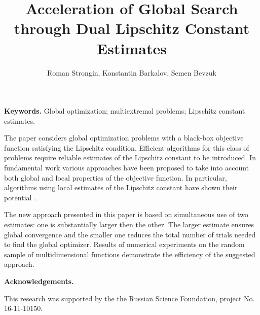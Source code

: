 \documentclass[oribibl]{llncs}
\begin{document}
\cleardoublepage

\title{Acceleration of Global Search through Dual Lipschitz Constant Estimates}
\author{Roman Strongin, Konstantin Barkalov, Semen Bevzuk}



\maketitle

\thispagestyle{fancy}

\textbf{Keywords.} Global optimization; multiextremal problems; Lipschitz constant estimates.

 \vspace*{0.5cm}


The paper considers global optimization problems with a black-box objective function satisfying the Lipschitz condition. 
Efficient algorithms for this class of problems require reliable estimates of the Lipschitz constant to be introduced. 
In fundamental work \cite{Book} various approaches have been proposed to take into account both global and local properties of the objective function. 
In particular, algorithms using local estimates of the Lipschitz constant have shown their potential \cite{Sergeyev10, Sergeyev16}.

The new approach presented in this paper is based on simultaneous use of two estimates: one is substantially larger then the other. 
The larger estimate ensures global convergence and the smaller one reduces the total number of trials needed to find the global optimizer.
Results of numerical experiments on the random sample of multidimensional functions demonstrate the efficiency of the suggested approach.  

\textbf{Acknowledgements.}

This research was supported by the the Russian Science Foundation, project No.\,16-11-10150.

\vspace{0.5cm}
\end{document}
